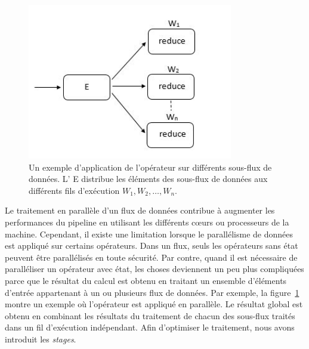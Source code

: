 \begin{figure}[ht]
\centering
     \includegraphics[width=0.8\textwidth]{Figures/StageDataParallel.jpg}
      \caption[Un exemple d'application de l'op\'erateur  sur diff\'erents sous-flux de donn\'ees.]{Un exemple d'application de l'op\'erateur  sur diff\'erents sous-flux de donn\'ees. L' E distribue  les \'el\'ements des sous-flux de donn\'ees aux diff\'erents fils d'ex\'ecution $W_1, W_2, \ldots, W_n$.}
       \label{StageDataParallel.fig}
\end{figure}

Le traitement en parall\`ele d'un flux de donn\'ees contribue \`a augmenter les performances du pipeline en utilisant les diff\'erents cœurs ou processeurs de la machine. Cependant, il existe une limitation lorsque le parall\'elisme de donn\'ees est appliqu\'e sur certains op\'erateurs. Dans un flux, seuls les op\'erateurs sans \'etat peuvent \^etre parall\'elis\'es en toute s\'ecurit\'e. Par contre, quand il est n\'ecessaire de parall\'eliser un op\'erateur avec \'etat, les choses deviennent un peu plus compliqu\'ees parce que le r\'esultat du calcul est obtenu en traitant un ensemble d'\'el\'ements d'entr\'ee appartenant \`a un ou plusieurs flux de donn\'ees. Par exemple, la figure~\ref{StageDataParallel.fig} montre un exemple o\`u l'op\'erateur  est appliqu\'e en parall\`ele. Le r\'esultat global est obtenu en combinant les r\'esultats du traitement de chacun des sous-flux trait\'es dans un fil d'ex\'ecution ind\'ependant. Afin d'optimiser le traitement, nous avons introduit les \emph{stages}.


